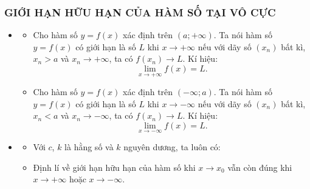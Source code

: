 \subsubsection{GIỚI HẠN HỮU HẠN CỦA HÀM SỐ TẠI VÔ CỰC}
\begin{itemize}
	\item [\iconMT] 
	\begin{itemize}
		\item Cho hàm số $y=f(x)$ xác định trên $\left({a;+\infty}\right) $. Ta nói hàm số $y=f(x)$ có giới hạn là số $L$ khi $x\to +\infty $ nếu với dãy số $\left({x_n}\right)$ bất kì, $x_n>a$ và $x_n\to +\infty $, ta có $f\left({x_n}\right)\to L $. Kí hiệu: $$\lim\limits_{x\to +\infty}f(x)=L. $$
		\item Cho hàm số $y=f(x)$ xác định trên $\left({-\infty;a}\right) $. Ta nói hàm số $y=f(x)$ có giới hạn là số $L$ khi $x\to -\infty $ nếu với dãy số $\left({x_n}\right)$ bất kì, $x_n<a$ và $x_n\to -\infty $, ta có $f\left({x_n}\right)\to L $. 
		Kí hiệu: $$\lim\limits_{x\to -\infty}f(x)=L. $$
	\end{itemize}
	\item [\iconMT]  
	\begin{khung}
	\begin{itemize}
		\item  Với $c$, $k$ là hằng số và $k$ nguyên dương, ta luôn có:
	\item  Định lí về giới hạn hữu hạn của hàm số khi $x\to x_0$ vẫn còn đúng khi $x\to +\infty $ hoặc $x\to -\infty $.
\end{itemize}
\end{khung}
\end{itemize}

